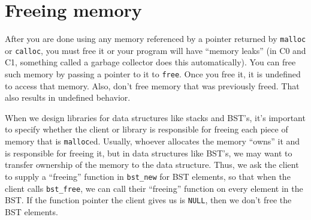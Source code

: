 \section*{Freeing memory%
}

After you are done using any memory referenced by a pointer returned
by \lstinline[language=C]'malloc' or \lstinline[language=C]'calloc',
you must free it or your program will have ``memory leaks'' (in C0 and
C1, something called a garbage collector does this automatically). You
can free such memory by passing a pointer to it to
\lstinline[language=C]'free'. Once you free it, it is undefined to
access that memory. Also, don't free memory that was previously
freed. That also results in undefined behavior.

When we design libraries for data structures like stacks and BST's,
it's important to specify whether the client or library is responsible
for freeing each piece of memory that is
\lstinline[language=C]'malloc'ed. Usually, whoever allocates the
memory ``owns'' it and is responsible for freeing it, but in data
structures like BST's, we may want to transfer ownership of the memory
to the data structure. Thus, we ask the client to supply a ``freeing''
function in \lstinline[language=C]'bst_new' for BST elements, so that
when the client calls \lstinline[language=C]'bst_free', we can call
their ``freeing'' function on every element in the BST. If the
function pointer the client gives us is \lstinline[language=C]'NULL',
then we don't free the BST elements.


